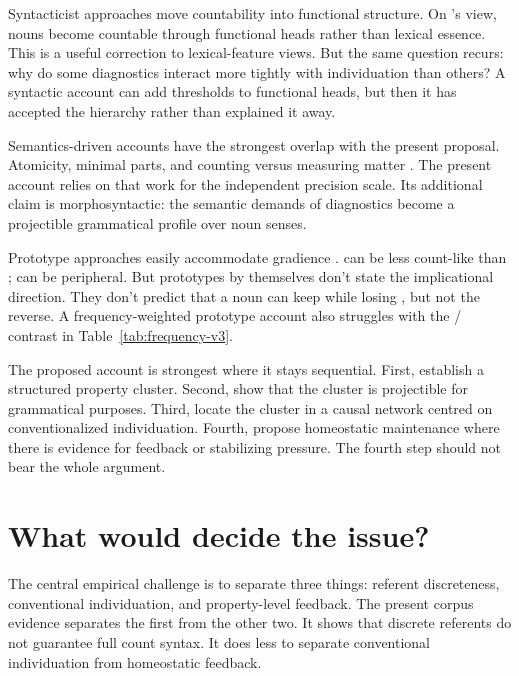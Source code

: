 \documentclass[12pt,a4paper]{article}
\begin{document}
Syntacticist approaches move countability into functional structure. On \textcite{borer2005}'s view, nouns become countable through functional heads rather than lexical essence. This is a useful correction to lexical-feature views. But the same question recurs: why do some diagnostics interact more tightly with individuation than others? A syntactic account can add thresholds to functional heads, but then it has accepted the hierarchy rather than explained it away.

Semantics-driven accounts have the strongest overlap with the present proposal. Atomicity, minimal parts, and counting versus measuring matter \citep{chierchia1998,rothstein2010,grimm2018}. The present account relies on that work for the independent precision scale. Its additional claim is morphosyntactic: the semantic demands of diagnostics become a projectible grammatical profile over noun senses.

Prototype approaches easily accommodate gradience \citep{taylor2003,aarts2007}.  can be less count-like than ;  can be peripheral. But prototypes by themselves don't state the implicational direction. They don't predict that a noun can keep  while losing , but not the reverse. A frequency-weighted prototype account also struggles with the / contrast in Table~\ref{tab:frequency-v3}.

The proposed account is strongest where it stays sequential. First, establish a structured property cluster. Second, show that the cluster is projectible for grammatical purposes. Third, locate the cluster in a causal network centred on conventionalized individuation. Fourth, propose homeostatic maintenance where there is evidence for feedback or stabilizing pressure. The fourth step should not bear the whole argument.

\section{What would decide the issue?}\label{sec:tests-v3}

The central empirical challenge is to separate three things: referent discreteness, conventional individuation, and property-level feedback. The present corpus evidence separates the first from the other two. It shows that discrete referents do not guarantee full count syntax. It does less to separate conventional individuation from homeostatic feedback.
\end{document}
